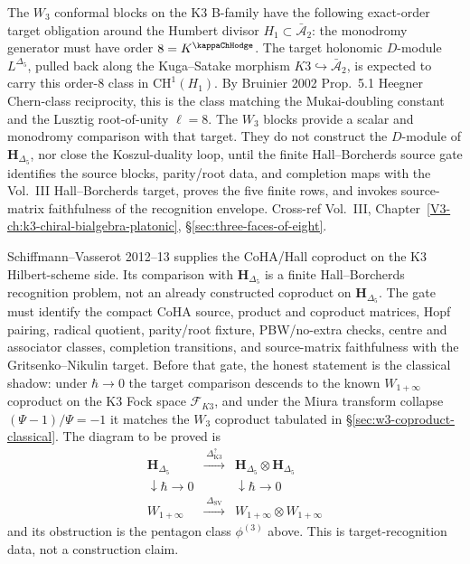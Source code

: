 \begin{remark}
\label{rem:w-algebras-w3-2}
The $W_3$ conformal blocks on the K3 B-family have the following
exact-order target obligation around the Humbert divisor
$H_1\subset\bar{\mathcal A}_2$: the monodromy generator must have
order $8 = K^{\kappaChHodge}$. The target holonomic
$D$-module $L^{\Delta_5}$, pulled back along the Kuga--Satake morphism
$K3\hookrightarrow\bar{\mathcal A}_2$, is expected to carry this
order-$8$ class in $\mathrm{CH}^1(H_1)$. By Bruinier 2002 Prop.~5.1
Heegner Chern-class reciprocity, this is the class matching the
Mukai-doubling constant and the Lusztig root-of-unity $\ell = 8$.
The $W_3$ blocks provide a scalar and monodromy comparison with that
target. They do not construct the $D$-module of
$\mathbf H_{\Delta_5}$, nor close the Koszul-duality loop, until the
finite Hall--Borcherds source gate identifies the source blocks,
parity/root data, and completion maps with the Vol.~III
Hall--Borcherds target, proves the five finite rows, and invokes
source-matrix faithfulness of the recognition envelope. Cross-ref
Vol.~III,
Chapter~\ref{V3-ch:k3-chiral-bialgebra-platonic},
\S\ref{sec:three-faces-of-eight}.
\end{remark}

\begin{remark}
\label{rem:w-algebras-w3-3}
Schiffmann--Vasserot 2012--13 supplies the CoHA/Hall coproduct on the
K3 Hilbert-scheme side. Its comparison with
$\mathbf H_{\Delta_5}$ is a finite Hall--Borcherds recognition problem,
not an already constructed coproduct on $\mathbf H_{\Delta_5}$. The gate
must identify the compact CoHA source, product and coproduct matrices,
Hopf pairing, radical quotient, parity/root fixture, PBW/no-extra checks,
centre and associator classes, completion transitions, and source-matrix
faithfulness with the Gritsenko--Nikulin target. Before that gate, the
honest statement is the classical shadow: under
$\hbar\to 0$ the target comparison descends to the known
$W_{1+\infty}$ coproduct on the K3 Fock space $\mathcal F_{K3}$, and
under the Miura transform collapse $(\Psi-1)/\Psi = -1$ it matches the
$W_3$ coproduct tabulated in \S\ref{sec:w3-coproduct-classical}. The
diagram to be proved is
\[
\begin{array}{ccc}
\mathbf H_{\Delta_5} & \xrightarrow{\;\Delta_{\mathrm{K3}}^{?}\;} & \mathbf H_{\Delta_5}\otimes\mathbf H_{\Delta_5} \\
\downarrow{\scriptstyle\hbar\to 0} & & \downarrow{\scriptstyle\hbar\to 0} \\
W_{1+\infty} & \xrightarrow{\;\Delta_{\mathrm{SV}}\;} & W_{1+\infty}\otimes W_{1+\infty}
\end{array}
\]
and its obstruction is the pentagon class $\phi^{(3)}$ above. This is
target-recognition data, not a construction claim.
\end{remark}
